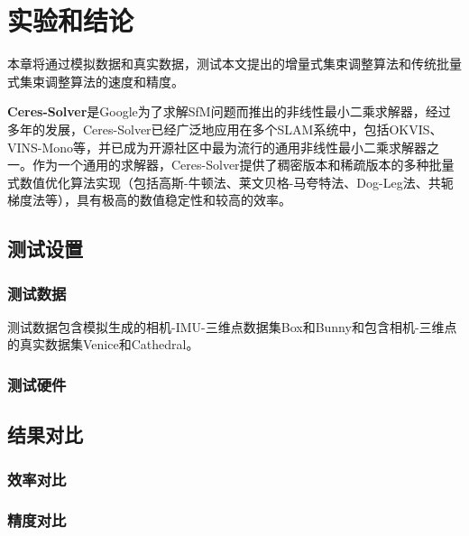 \chapter{实验和结论}\label{ch:exp}

本章将通过模拟数据和真实数据，测试本文提出的增量式集束调整算法和传统批量式集束调整算法的速度和精度。

\textbf{Ceres-Solver}\citep{ceres-solver}是Google为了求解SfM问题而推出的非线性最小二乘求解器，经过多年的发展，Ceres-Solver已经广泛地应用在多个SLAM系统中，包括OKVIS、VINS-Mono等，并已成为开源社区中最为流行的通用非线性最小二乘求解器之一。作为一个通用的求解器，Ceres-Solver提供了稠密版本和稀疏版本的多种批量式数值优化算法实现（包括高斯-牛顿法、莱文贝格-马夸特法、Dog-Leg法、共轭梯度法等），具有极高的数值稳定性和较高的效率。

\section{测试设置}

\subsection{测试数据}

测试数据包含模拟生成的相机-IMU-三维点数据集Box和Bunny和包含相机-三维点的真实数据集Venice\citep{kummerle2011g}和Cathedral\citep{kim2014influence}。

\subsection{测试硬件}

\section{结果对比}

\subsection{效率对比}

\subsection{精度对比}
